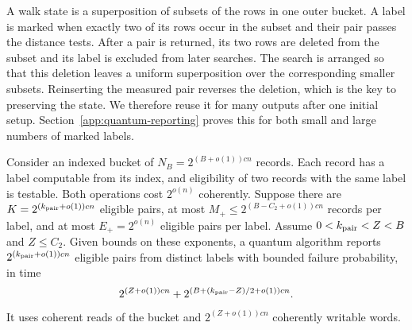 \documentclass[runningheads,envcountsame,envcountsect,orivec]{llncs}
\begin{document}
A walk state is a superposition of subsets of the rows in one
outer bucket. A label is marked when exactly two of its rows
occur in the subset and their pair passes the distance tests.
After a pair is returned, its two rows are deleted from the
subset and its label is excluded from later searches. The
search is arranged so that this deletion leaves a uniform
superposition over the corresponding smaller subsets. Reinserting
the measured pair reverses the deletion, which is the key to
preserving the state. We therefore reuse it for many outputs
after one initial setup. Section~\ref{app:quantum-reporting}
proves this for both small and large numbers of marked labels.

\begin{lemma}
\label{lem:tagged-johnson}
Consider an indexed bucket of $N_B=2^{(B+o(1))cn}$ records. Each
record has a label computable from its index, and eligibility of
two records with the same label is testable. Both operations
cost $2^{o(n)}$ coherently. Suppose there are
$K=2^{(k_{\rm pair}+o(1))cn}$ eligible pairs, at most
$M_+\le2^{(B-C_2+o(1))cn}$ records per label, and at most
$E_+=2^{o(n)}$ eligible pairs per label. Assume
$0<k_{\rm pair}<Z<B$ and $Z\le C_2$.
Given bounds on these exponents, a quantum algorithm reports
$2^{(k_{\rm pair}+o(1))cn}$ eligible pairs from distinct labels
with bounded failure probability, in time
\begin{align}
 2^{(Z+o(1))cn}
  +2^{(B+(k_{\rm pair}-Z)/2+o(1))cn}.
 \label{eq:tagged-johnson-cost}
\end{align}
It uses coherent reads of the bucket and
$2^{(Z+o(1))cn}$ coherently writable words.
\end{lemma}
\end{document}
